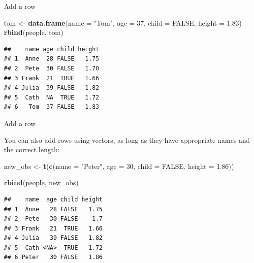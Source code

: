 \documentclass[ignorenonframetext,]{beamer}
\newenvironment{Shaded}{\begin{snugshade}}{\end{snugshade}}
\newcommand{\DataTypeTok}[1]{\textcolor[rgb]{0.13,0.29,0.53}{#1}}
\newcommand{\DecValTok}[1]{\textcolor[rgb]{0.00,0.00,0.81}{#1}}
\newcommand{\FloatTok}[1]{\textcolor[rgb]{0.00,0.00,0.81}{#1}}
\newcommand{\KeywordTok}[1]{\textcolor[rgb]{0.13,0.29,0.53}{\textbf{#1}}}
\newcommand{\NormalTok}[1]{#1}
\newcommand{\OtherTok}[1]{\textcolor[rgb]{0.56,0.35,0.01}{#1}}
\newcommand{\StringTok}[1]{\textcolor[rgb]{0.31,0.60,0.02}{#1}}
\begin{document}
\begin{frame}[fragile]{Add a row}
\protect\hypertarget{add-a-row-2}{}

\begin{Shaded}
\begin{Highlighting}[]
\NormalTok{tom <-}\StringTok{ }\KeywordTok{data.frame}\NormalTok{(}\DataTypeTok{name =} \StringTok{"Tom"}\NormalTok{, }\DataTypeTok{age =} \DecValTok{37}\NormalTok{, }
                  \DataTypeTok{child =} \OtherTok{FALSE}\NormalTok{, }\DataTypeTok{height =} \FloatTok{1.83}\NormalTok{)}
\KeywordTok{rbind}\NormalTok{(people, tom)}
\end{Highlighting}
\end{Shaded}

\begin{verbatim}
##    name age child height
## 1  Anne  28 FALSE   1.75
## 2  Pete  30 FALSE   1.70
## 3 Frank  21  TRUE   1.66
## 4 Julia  39 FALSE   1.82
## 5  Cath  NA  TRUE   1.72
## 6   Tom  37 FALSE   1.83
\end{verbatim}

\end{frame}

\begin{frame}[fragile]{Add a row}
\protect\hypertarget{add-a-row-3}{}

You can also add rows using vectors, as long as they have appropriate
names and the correct length:

\begin{Shaded}
\begin{Highlighting}[]
\NormalTok{new_obs <-}\StringTok{ }\KeywordTok{t}\NormalTok{(}\KeywordTok{c}\NormalTok{(}\DataTypeTok{name =} \StringTok{"Peter"}\NormalTok{, }\DataTypeTok{age =} \DecValTok{30}\NormalTok{, }
               \DataTypeTok{child =} \OtherTok{FALSE}\NormalTok{, }\DataTypeTok{height =} \FloatTok{1.86}\NormalTok{))}

\KeywordTok{rbind}\NormalTok{(people, new_obs)}
\end{Highlighting}
\end{Shaded}

\begin{verbatim}
##    name  age child height
## 1  Anne   28 FALSE   1.75
## 2  Pete   30 FALSE    1.7
## 3 Frank   21  TRUE   1.66
## 4 Julia   39 FALSE   1.82
## 5  Cath <NA>  TRUE   1.72
## 6 Peter   30 FALSE   1.86
\end{verbatim}

\end{frame}
\end{document}
